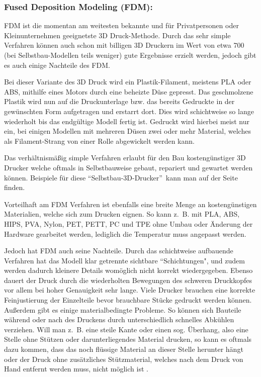 \subsubsection{Fused Deposition Modeling (FDM):}

FDM ist die momentan am weitesten bekannte und für Privatpersonen oder Kleinunternehmen geeignetste 3D Druck-Methode. Durch das sehr simple Verfahren können auch schon mit billigen 3D Druckern im Wert von etwa 700\EURO ~ (bei Selbstbau-Modellen teils weniger) gute Ergebnisse erzielt werden, jedoch gibt es auch einige Nachteile des FDM.

Bei dieser Variante des 3D Druck wird ein Plastik-Filament, meistens PLA oder ABS, mithilfe eines Motors durch eine beheizte Düse gepresst. Das geschmolzene Plastik wird nun auf die Druckunterlage bzw. das bereits Gedruckte in der gewünschten Form aufgetragen und erstarrt dort.
Dies wird schichtweise so lange wiederholt bis das endgültige Modell fertig ist. Gedruckt wird hierbei meist nur ein, bei einigen Modellen mit mehreren Düsen zwei oder mehr Material, welches als Filament-Strang von einer Rolle abgewickelt werden kann.

Das verhältnismäßig simple Verfahren erlaubt für den Bau kostengünstiger 3D Drucker welche oftmals in Selbstbauweise gebaut, repariert und gewartet werden können. Beispiele für diese \textquotedblleft Selbstbau-3D-Drucker\textquotedblright~kann man auf der Seite  finden.

Vorteilhaft am FDM Verfahren ist ebenfalls eine breite Menge an kostengünstigen Materialien, welche sich zum Drucken eignen. So kann z.~B. mit PLA, ABS, HIPS, PVA, Nylon, PET, PETT, PC und TPE \parencite{MATERIALS} ohne Umbau oder Änderung der Hardware gearbeitet werden, lediglich die Temperatur muss angepasst werden.

Jedoch hat FDM auch seine Nachteile.
Durch das schichtweise aufbauende Verfahren hat das Modell klar getrennte sichtbare \textquotedblleft Schichtungen", und zudem werden dadurch kleinere Details womöglich nicht korrekt wiedergegeben. Ebenso dauert der Druck durch die wiederholten Bewegungen des schweren Druckkopfes vor allem bei hoher Genauigkeit sehr lange. Viele Drucker brauchen eine korrekte Feinjustierung der Einzelteile bevor brauchbare Stücke gedruckt werden können. Außerdem gibt es einige materialbedingte Probleme. So können sich Bauteile während oder nach des Druckens durch unterschiedlich schnelles Abkühlen verziehen. Will man z.~B. eine steile Kante oder einen sog. Überhang, also eine Stelle ohne Stützen oder darunterliegendes Material drucken, so kann es oftmals dazu kommen, dass das noch flüssige Material an dieser Stelle herunter hängt oder der Druck ohne zusätzliches Stützmaterial, welches nach dem Druck von Hand entfernt werden muss, nicht möglich ist \parencite[Informationen aus:][]{FDMDetail,DRUCKVERFAHREN}.